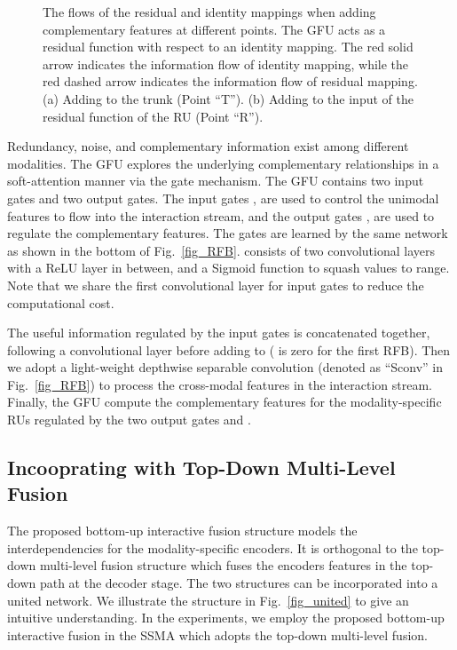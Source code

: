 \documentclass[letterpaper, 10 pt, conference]{ieeeconf}
\begin{document}
	\begin{figure}[!tb]
		\centering
		\hspace{4pt}
		\caption{The flows of the residual and identity mappings when adding complementary features at different points. The GFU acts as a residual function with respect to an identity mapping. The red solid arrow indicates the information flow of identity mapping, while the red dashed arrow indicates the information flow of residual mapping. (a) Adding to the trunk (Point ``T''). (b) Adding to the input of the residual function of the RU (Point ``R'').}
		\label{fig_res}
	\end{figure}
	
	Redundancy, noise, and complementary information exist among different modalities. The GFU explores the underlying complementary relationships in a soft-attention manner via the gate mechanism.
	The GFU contains two input gates and two output gates. The input gates ,  are used to control the unimodal features to flow into the interaction stream, and the output gates ,  are used to regulate the complementary features. The gates are learned by the same network  as shown in the bottom of Fig.~\ref{fig_RFB}.  consists of two convolutional layers with a ReLU layer in between, and a Sigmoid function  to squash values to  range. Note that we share the first convolutional layer for input gates to reduce the computational cost. 
	
	The useful information regulated by the input gates is concatenated together, following a  convolutional layer before adding to  ( is zero for the first RFB). Then we adopt a light-weight depthwise separable convolution (denoted as ``Sconv'' in Fig.~\ref{fig_RFB}) \cite{howard2017mobilenets} to process the cross-modal features in the interaction stream. Finally, the GFU compute the complementary features for the modality-specific RUs regulated by the two output gates  and .
	
	\subsection{Incooprating with Top-Down Multi-Level Fusion}
	The proposed bottom-up interactive fusion structure models the interdependencies for the modality-specific encoders. It is orthogonal to the top-down multi-level fusion structure which fuses the encoders features in the top-down path at the decoder stage. The two structures can be incorporated into a united network. We illustrate the structure in Fig.~\ref{fig_united} to give an intuitive understanding. In the experiments, we employ the proposed bottom-up interactive fusion in the SSMA\cite{valada2019self} which adopts the top-down multi-level fusion.
	
\end{document}
